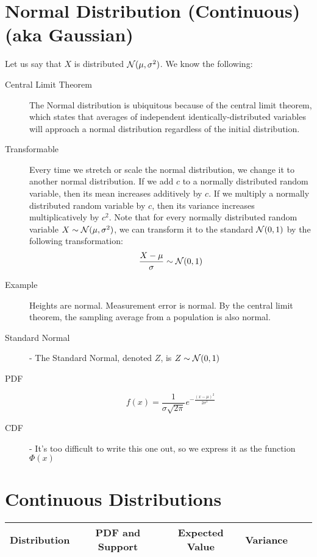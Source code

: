 \documentclass[11.5pt]{article}
\begin{document}
\begin{notes}
\begin{description}
\begin{description}
	
\end{description}
\end{description}

\section*{Normal Distribution (Continuous) (aka Gaussian)}
\begin{description}

\item Let us say that $X$ is distributed $\mathcal{N}(\mu, \sigma^2)$. We know the following:
\begin{description}
	\item[Central Limit Theorem] The Normal distribution is ubiquitous because of the central limit theorem, which states that averages of independent identically-distributed variables will approach a normal distribution regardless of the initial distribution.
	\item[Transformable] Every time we stretch or scale the normal distribution, we change it to another normal distribution. If we add $c$ to a normally distributed random variable, then its mean increases additively by $c$. If we multiply a normally distributed random variable by $c$, then its variance increases multiplicatively by $c^2$. Note that for every normally distributed random variable $X \sim \mathcal{N}(\mu, \sigma^2)$, we can transform it to the standard $\mathcal{N}(0, 1)$ by the following transformation:
	\[\frac{X - \mu}{\sigma} \sim \mathcal{N}(0, 1) \]
	\item[Example] Heights are normal. Measurement error is normal. By the central limit theorem, the sampling average from a population is also normal.
	\item[Standard Normal] - The Standard Normal, denoted $Z$, is $Z \sim \mathcal{N}(0, 1)$
	\item[PDF]
\[ f(x)=\frac{1}{\sigma \sqrt{2\pi}} e^{-\frac{(x - \mu)^2}{2 \sigma^2}} \]
	\item[CDF] - It's too difficult to write this one out, so we express it as the function $\Phi(x)$
\end{description}
\end{description}

\section*{Continuous Distributions}
\begin{center}
\renewcommand{\arraystretch}{3}
\begin{tabular}{cccccc}
\textbf{Distribution} & \textbf{PDF and Support} & \textbf{Expected Value}  & \textbf{Variance} \\
\hline


\end{tabular}
\end{center}
\end{notes}
\end{document}
